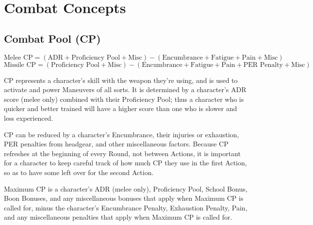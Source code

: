 \documentclass[oneside,11pt,english]{book}
\begin{document}
\section{Combat Concepts}
\subsection{Combat Pool (CP)}
\[\text{Melee CP} = (\text{ADR} + \text{Proficiency Pool} + \text{Misc}) - (\text{Encumbrance}+\text{Fatigue}+\text{Pain}+\text{Misc}) \]
\[\text{Missile CP} = (\text{Proficiency Pool} + \text{Misc})-(\text{Encumbrance} + \text{Fatigue} + \text{Pain} + \text{PER Penalty}+ \text{Misc}) \]

CP represents a character's skill with the weapon they’re using, and is used to
activate and power Maneuvers of all sorts. It is determined by a character's ADR
score (melee only) combined with their Proficiency Pool; thus a character who is
quicker and better trained will have a higher score than one who is slower and
less experienced. 

CP can be reduced by a character's Encumbrance, their injuries or exhaustion, PER penalties from %
headgear, and other miscellaneous factors. Because CP refreshes at the beginning
of every Round, not between Actions, it is important for a character to keep
careful track of how much CP they use in the first Action, so as to have some
left over for the second Action. 

Maximum CP is a character's ADR (melee only), Proficiency Pool, School Bonus,
Boon Bonuses, and any miscellaneous bonuses that apply when Maximum CP is called
for, minus the character's Encumbrance Penalty, Exhaustion Penalty, Pain, and
any miscellaneous penalties that apply when Maximum CP is called for. 
\end{document}
